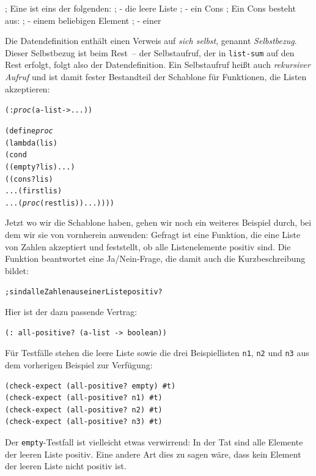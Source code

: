 \begin{pspdf}
\begin{ttfamily}\obeylines
; Eine  ist eins der folgenden:
; - die leere Liste
; - ein Cons
; Ein Cons besteht aus:
; - einem beliebigen Element
; - einer 
\end{ttfamily}
\end{pspdf}

Die Datendefinition enthält einen Verweis auf \emph{sich selbst},
genannt \emph{Selbstbezug}.  Dieser Selbstbezug ist
beim Rest~-- der Selbstaufruf, der in \texttt{list-sum} auf den Rest
erfolgt, folgt also der Datendefinition.  Ein Selbstaufruf
heißt auch \textit{rekursiver Aufruf} und ist
damit fester Bestandteil der Schablone für Funktionen, die Listen
akzeptieren:
%
\begin{alltt}
(: \textit{proc} (a-list -> ...))

(define \textit{proc}
  (lambda (lis)
    (cond
      ((empty? lis) ...)
      ((cons? lis)
       ... (first lis)
       ... (\textit{proc} (rest lis)) ...))))
\end{alltt}
%
Jetzt wo wir die Schablone haben, gehen wir noch ein weiteres Beispiel
durch, bei dem wir sie von vornherein anwenden:  Gefragt ist eine
Funktion, die eine Liste von Zahlen akzeptiert und feststellt, ob alle
Listenelemente  positiv sind.  Die Funktion beantwortet eine
Ja/Nein-Frage, die damit auch die Kurzbeschreibung bildet:
%
\begin{alltt}
; sind alle Zahlen aus einer Liste positiv?
\end{alltt}
%
Hier ist der dazu passende Vertrag:
%
\begin{verbatim}
(: all-positive? (a-list -> boolean))
\end{verbatim}
%
Für Testfälle stehen die leere Liste sowie die drei Beispiellisten
\texttt{n1}, \texttt{n2} und \texttt{n3} aus dem vorherigen Beispiel
zur Verfügung:
%
\begin{verbatim}
(check-expect (all-positive? empty) #t)
(check-expect (all-positive? n1) #t)
(check-expect (all-positive? n2) #t)
(check-expect (all-positive? n3) #t)
\end{verbatim}
%
Der \texttt{empty}-Testfall ist vielleicht etwas verwirrend: In der
Tat sind alle Elemente der leeren Liste positiv.  Eine andere Art dies
zu sagen wäre, dass kein Element der leeren Liste nicht positiv ist.

